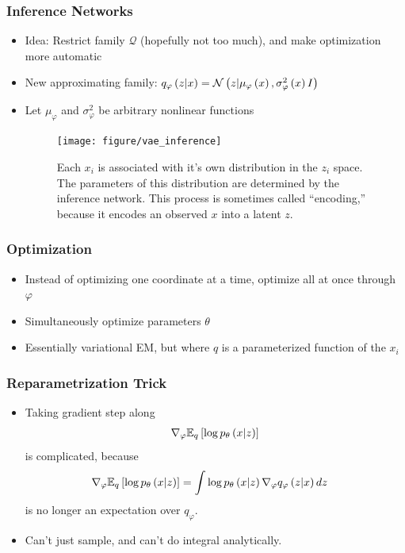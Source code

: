 \documentclass[10pt,mathserif]{beamer}
\begin{document}
\begin{frame}
  \frametitle{Inference Networks}
  \begin{itemize}
  \item Idea: Restrict family $\mathcal{Q}$ (hopefully not too much), and make
    optimization more automatic
  \item New approximating family: $q_{\varphi}\left(z \vert x\right) = \mathcal{N}\left(z \vert
    \mu_{\varphi}\left(x\right), \sigma^{2}_{\varphi}\left(x\right) I\right)$
  \item Let $\mu_{\varphi}$ and $\sigma^{2}_{\varphi}$ be arbitrary nonlinear
    functions
    \begin{figure}
        \centering
        \texttt{[image: figure/vae\_inference]}
        \caption{Each $x_i$ is associated with it's own distribution in the
          $z_i$ space. The parameters of this distribution are determined by the
          inference network. This process is sometimes called ``encoding,''
          because it encodes an observed $x$ into a latent
          $z$. \label{fig:vae_inference} }
    \end{figure}
  \end{itemize}
\end{frame}

\begin{frame}
  \frametitle{Optimization}
\begin{itemize}
\item Instead of optimizing one coordinate at a time, optimize all at once
  through $\varphi$
\item Simultaneously optimize parameters $\theta$
\item Essentially variational EM, but where $q$ is a parameterized function of
  the $x_{i}$
\end{itemize}
\end{frame}

\begin{frame}
  \frametitle{Reparametrization Trick}
  \begin{itemize}
  \item Taking gradient step along
  \begin{align*}
    \nabla_{\varphi} \mathbb{E}_{q}\left[{\log p_{\theta}\left(x \vert z\right)}\right]
  \end{align*}
  is complicated, because
  \begin{align*}
    \nabla_{\varphi} \mathbb{E}_{q}\left[{\log p_{\theta}\left(x \vert z\right)}\right] &= \int \log p_{\theta}\left(x \vert z\right)
    \nabla_{\varphi}q_{\varphi}\left(z \vert x\right)dz
  \end{align*}
  is no longer an expectation over $q_{\varphi}$.
  \item Can't just sample, and can't do integral analytically.
  \end{itemize}
\end{frame}
\end{document}
